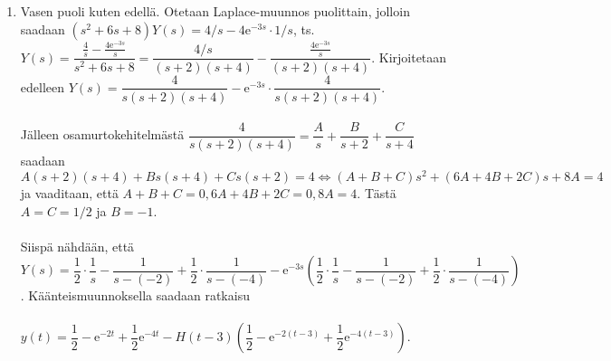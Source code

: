 \documentclass[12pt,fleqn]{article}
\begin{document}
\begin{enumerate}[label=\textbf{\arabic*.}]
\begin{enumerate}[label=\textbf{\alph*)}]
\item Vasen puoli kuten edellä. Otetaan Laplace-muunnos puolittain, jolloin saadaan \((s^2+6s+8)Y(s)=4/s-4\text{e}^{-3s}\cdot 1/s\), ts. \(Y(s)=\dfrac{\frac{4}{s}-\frac{4\text{e}^{-3s}}{s}}{s^2+6s+8}=\dfrac{4/s}{(s+2)(s+4)}-\dfrac{\frac{4\text{e}^{-3s}}{s}}{(s+2)(s+4)}\). Kirjoitetaan edelleen \(Y(s)=\dfrac{4}{s(s+2)(s+4)}-\text{e}^{-3s}\cdot \dfrac{4}{s(s+2)(s+4)}\).\\
 \\
Jälleen osamurtokehitelmästä \(\dfrac{4}{s(s+2)(s+4)}=\dfrac{A}{s}+\dfrac{B}{s+2}+\dfrac{C}{s+4}\) saadaan \(A(s+2)(s+4)+Bs(s+4)+Cs(s+2)=4\iff (A+B+C)s^2 + (6A+4B+2C)s + 8A = 4\) ja vaaditaan, että \(A+B+C=0, 6A+4B+2C=0, 8A=4\). Tästä \(A=C=1/2\) ja \(B=-1\).\\
 \\
Siispä nähdään, että\\ \(Y(s)=\dfrac{1}{2}\cdot \dfrac{1}{s}-\dfrac{1}{s-(-2)}+\dfrac{1}{2}\cdot \dfrac{1}{s-(-4)}-\text{e}^{-3s}\left (\dfrac{1}{2}\cdot \dfrac{1}{s}-\dfrac{1}{s-(-2)}+\dfrac{1}{2}\cdot \dfrac{1}{s-(-4)}\right )\). Käänteismuunnoksella saadaan ratkaisu\\ 
\\ \(y(t)=\dfrac{1}{2}-\text{e}^{-2t}+\dfrac{1}{2}\text{e}^{-4t}-H(t-3)\left (\dfrac{1}{2}-\text{e}^{-2(t-3)}+\dfrac{1}{2}\text{e}^{-4(t-3)}\right )\).

\end{enumerate}
\end{enumerate}

\newpage
\end{document}
